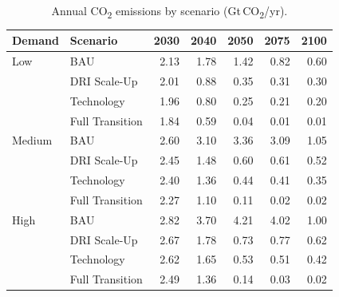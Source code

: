 
\begin{table}[h!]
\centering
\small
\caption{Annual CO\textsubscript{2} emissions by scenario (Gt\,CO\textsubscript{2}/yr).}
\label{tab:app_co2_emissions}
\begin{tabular}{llrrrrr}
\toprule
Demand & Scenario & 2030 & 2040 & 2050 & 2075 & 2100 \\
\midrule
Low & BAU & 2.13 & 1.78 & 1.42 & 0.82 & 0.60 \\
 & DRI Scale-Up & 2.01 & 0.88 & 0.35 & 0.31 & 0.30 \\
 & Technology & 1.96 & 0.80 & 0.25 & 0.21 & 0.20 \\
 & Full Transition & 1.84 & 0.59 & 0.04 & 0.01 & 0.01 \\
\midrule
Medium & BAU & 2.60 & 3.10 & 3.36 & 3.09 & 1.05 \\
 & DRI Scale-Up & 2.45 & 1.48 & 0.60 & 0.61 & 0.52 \\
 & Technology & 2.40 & 1.36 & 0.44 & 0.41 & 0.35 \\
 & Full Transition & 2.27 & 1.10 & 0.11 & 0.02 & 0.02 \\
\midrule
High & BAU & 2.82 & 3.70 & 4.21 & 4.02 & 1.00 \\
 & DRI Scale-Up & 2.67 & 1.78 & 0.73 & 0.77 & 0.62 \\
 & Technology & 2.62 & 1.65 & 0.53 & 0.51 & 0.42 \\
 & Full Transition & 2.49 & 1.36 & 0.14 & 0.03 & 0.02 \\
\bottomrule
\end{tabular}
\end{table}


